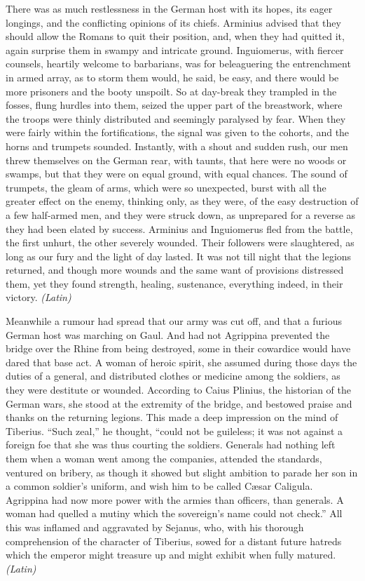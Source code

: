 There was as much restlessness in the German host with its hopes, its eager longings, and the conflicting opinions of its chiefs. Arminius advised that they should allow the Romans to quit their position, and, when they had quitted it, again surprise them in swampy and intricate ground. Inguiomerus, with fiercer counsels, heartily welcome to barbarians, was for beleaguering the entrenchment in armed array, as to storm them would, he said, be easy, and there would be more prisoners and the booty unspoilt. So at day-break they trampled in the fosses, flung hurdles into them, seized the upper part of the breastwork, where the troops were thinly distributed and seemingly paralysed by fear. When they were fairly within the fortifications, the signal was given to the cohorts, and the horns and trumpets sounded. Instantly, with a shout and sudden rush, our men threw themselves on the German rear, with taunts, that here were no woods or swamps, but that they were on equal ground, with equal chances. The sound of trumpets, the gleam of arms, which were so unexpected, burst with all the greater effect on the enemy, thinking only, as they were, of the easy destruction of a few half-armed men, and they were struck down, as unprepared for a reverse as they had been elated by success. Arminius and Inguiomerus fled from the battle, the first unhurt, the other severely wounded. Their followers were slaughtered, as long as our fury and the light of day lasted. It was not till night that the legions returned, and though more wounds and the same want of provisions distressed them, yet they found strength, healing, sustenance, everything indeed, in their victory. \emph{(Latin)}


Meanwhile a rumour had spread that our army was cut off, and that a furious German host was marching on Gaul. And had not Agrippina prevented the bridge over the Rhine from being destroyed, some in their cowardice would have dared that base act. A woman of heroic spirit, she assumed during those days the duties of a general, and distributed clothes or medicine among the soldiers, as they were destitute or wounded. According to Caius Plinius, the historian of the German wars, she stood at the extremity of the bridge, and bestowed praise and thanks on the returning legions. This made a deep impression on the mind of Tiberius. ``Such zeal,'' he thought, ``could not be guileless; it was not against a foreign foe that she was thus courting the soldiers. Generals had nothing left them when a woman went among the companies, attended the standards, ventured on bribery, as though it showed but slight ambition to parade her son in a common soldier's uniform, and wish him to be called Cæsar Caligula. Agrippina had now more power with the armies than officers, than generals. A woman had quelled a mutiny which the sovereign's name could not check.'' All this was inflamed and aggravated by Sejanus, who, with his thorough comprehension of the character of Tiberius, sowed for a distant future hatreds which the emperor might treasure up and might exhibit when fully matured. \emph{(Latin)}

